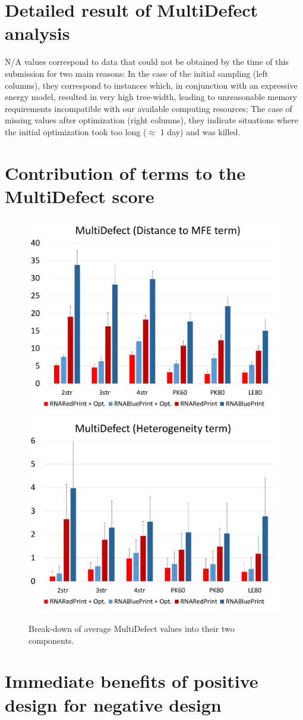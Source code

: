 \documentclass[10pt]{article}
\begin{document}
\section{Detailed result of MultiDefect analysis}\label{sec:validity}
N/A values correspond to data that could not be obtained by the time of this submission for two main reasons: In the case of the initial sampling (left columns), they correspond to instances which, in conjunction with an expressive energy model, resulted in very high tree-width, leading to unreasonable memory requirements incompatible with our available computing resources; The case of missing values after optimization  (right columns), they indicate situations where the initial optimization took too long ($\approx$ 1 day) and was killed.


\section{Contribution of terms to the MultiDefect score}
\label{sec:improvements}
\begin{figure}[h!]
\includegraphics[width=.48\textwidth]{Figs/statistics-Term1}
\includegraphics[width=.48\textwidth]{Figs/statistics-Term2}
\caption{Break-down of average MultiDefect values into their two components.}
\end{figure}


\section{Immediate benefits of positive design for negative design}
\end{document}
